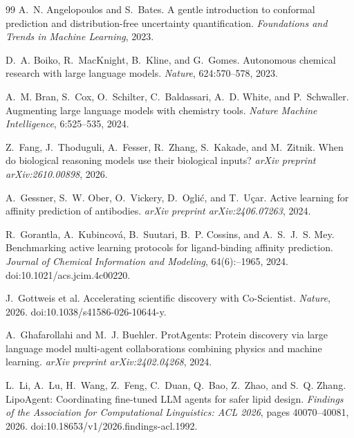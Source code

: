 \begin{thebibliography}{99}
\label{references-start}
A.~N. Angelopoulos and S.~Bates.
A gentle introduction to conformal prediction and distribution-free uncertainty quantification.
\emph{Foundations and Trends in Machine Learning}, 2023.

D.~A. Boiko, R.~MacKnight, B.~Kline, and G.~Gomes.
Autonomous chemical research with large language models.
\emph{Nature}, 624:570--578, 2023.

A.~M. Bran, S.~Cox, O.~Schilter, C.~Baldassari, A.~D. White, and P.~Schwaller.
Augmenting large language models with chemistry tools.
\emph{Nature Machine Intelligence}, 6:525--535, 2024.

Z.~Fang, J.~Thoduguli, A.~Fesser, R.~Zhang, S.~Kakade, and M.~Zitnik.
When do biological reasoning models use their biological inputs?
\emph{arXiv preprint arXiv:2610.00898}, 2026.

A.~Gessner, S.~W. Ober, O.~Vickery, D.~Ogli\'c, and T.~U\c{c}ar.
Active learning for affinity prediction of antibodies. \emph{arXiv preprint arXiv:2406.07263}, 2024.

R.~Gorantla, A.~Kubincov\'a, B.~Suutari, B.~P. Cossins, and A.~S.~J.~S. Mey.
Benchmarking active learning protocols for ligand-binding affinity prediction.
\emph{Journal of Chemical Information and Modeling}, 64(6):--1965, 2024.
doi:10.1021/acs.jcim.4c00220.

J.~Gottweis et al. Accelerating scientific discovery with Co-Scientist.
\emph{Nature}, 2026. doi:10.1038/s41586-026-10644-y.

A.~Ghafarollahi and M.~J. Buehler.
ProtAgents: Protein discovery via large language model multi-agent collaborations combining physics and machine learning.
\emph{arXiv preprint arXiv:2402.04268}, 2024.

L.~Li, A.~Lu, H.~Wang, Z.~Feng, C.~Duan, Q.~Bao, Z.~Zhao, and S.~Q. Zhang.
LipoAgent: Coordinating fine-tuned LLM agents for safer lipid design.
\emph{Findings of the Association for Computational Linguistics: ACL 2026}, pages 40070--40081, 2026.
doi:10.18653/v1/2026.findings-acl.1992.


\end{thebibliography}

